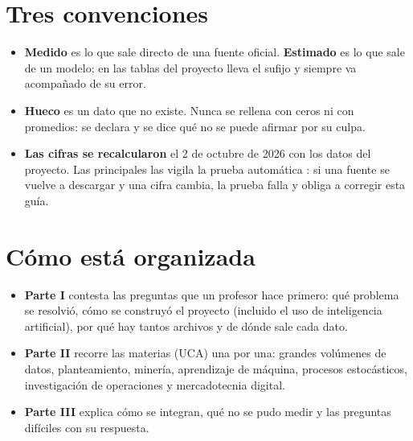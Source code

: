 \section*{Tres convenciones}
\begin{itemize}
\item \textbf{Medido} es lo que sale directo de una fuente oficial. \textbf{Estimado} es lo que sale de un modelo; en las
  tablas del proyecto lleva el sufijo  y siempre va acompañado de su error.
\item \textbf{Hueco} es un dato que no existe. Nunca se rellena con ceros ni con promedios: se declara y se dice qué no se
  puede afirmar por su culpa.
\item \textbf{Las cifras se recalcularon} el 2 de octubre de 2026 con los datos del proyecto. Las principales las vigila la
  prueba automática : si una fuente se vuelve a descargar y una cifra cambia, la prueba
  falla y obliga a corregir esta guía.
\end{itemize}

\section*{Cómo está organizada}
\begin{itemize}
\item \textbf{Parte I} contesta las preguntas que un profesor hace primero: qué problema se resolvió, cómo se construyó el
  proyecto (incluido el uso de inteligencia artificial), por qué hay tantos archivos y de dónde sale cada dato.
\item \textbf{Parte II} recorre las materias (UCA) una por una: grandes volúmenes de datos, planteamiento, minería,
  aprendizaje de máquina, procesos estocásticos, investigación de operaciones y mercadotecnia digital.
\item \textbf{Parte III} explica cómo se integran, qué no se pudo medir y las preguntas difíciles con su respuesta.
\end{itemize}
